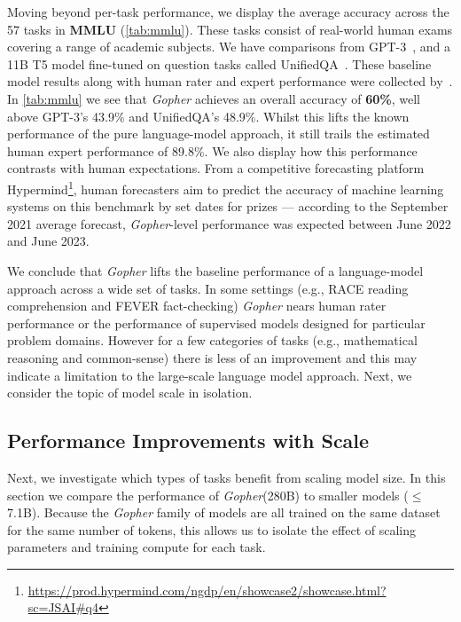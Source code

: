 \documentclass[11pt, a4paper, logo, internal, copyright, nonumbering]{deepmind}
\newcommand{\gopher}{\textit{Gopher}\xspace}
\begin{document}
Moving beyond per-task performance, we display the average accuracy across the 57 tasks in \textbf{MMLU} (\autoref{tab:mmlu}). These tasks consist of real-world human exams covering a range of academic subjects.
We have comparisons from GPT-3~\citep{gpt3}, and a 11B T5 model fine-tuned on question tasks called UnifiedQA~\citep{khashabi2020unifiedqa}. These baseline model results along with human rater and expert performance were collected by~\citet{hendrycks2020measuring}. In \autoref{tab:mmlu} we see that \gopher achieves an overall accuracy of \textbf{60\%}, well above GPT-3's 43.9\% and UnifiedQA's 48.9\%.
Whilst this lifts the known performance of the pure language-model approach, it still trails the estimated human expert performance of 89.8\%. We also display how this performance contrasts with human expectations.
From a competitive forecasting platform Hypermind\footnote{\url{https://prod.hypermind.com/ngdp/en/showcase2/showcase.html?sc=JSAI\#q4}}, human forecasters aim to predict the accuracy of machine learning systems on this benchmark by set dates for prizes --- according to the September 2021 average forecast, \gopher-level performance was expected between June 2022 and June 2023.


We conclude that \gopher lifts the baseline performance of a language-model approach across a wide set of tasks. In some settings (e.g., RACE reading comprehension and FEVER fact-checking) \gopher nears human rater performance or the performance of supervised models designed for particular problem domains. However for a few categories of tasks (e.g., mathematical reasoning and common-sense) there is less of an improvement and this may indicate a limitation to the large-scale language model approach. Next, we consider the topic of model scale in isolation.


\subsection{Performance Improvements with Scale}
Next, we investigate which types of tasks benefit from scaling model size. In this section we compare the performance of \gopher (280B) to smaller models ($\leq$ 7.1B). Because the \gopher family of models are all trained on the same dataset for the same number of tokens, this allows us to isolate the effect of scaling parameters and training compute for each task.   
\end{document}
